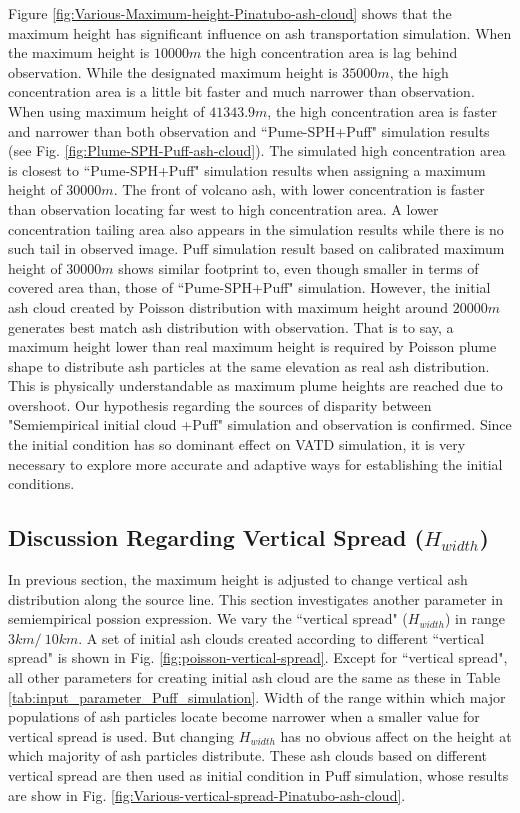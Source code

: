 \documentclass[draft,linenumbers]{agujournal2019}
\begin{document}
Figure \ref{fig:Various-Maximum-height-Pinatubo-ash-cloud} shows that the maximum height has significant influence on ash transportation simulation. When the maximum height is $10000 m$ the high concentration area is lag behind observation. While the designated maximum height is $35000 m$, the high concentration area is a little bit faster and much narrower than observation. When using maximum height of $41343.9 m$, the high concentration area is faster and narrower than both observation and ``Pume-SPH+Puff" simulation results (see Fig. \ref{fig:Plume-SPH-Puff-ash-cloud}). The simulated high concentration area is closest to ``Pume-SPH+Puff" simulation results when assigning a maximum height of $30000 m$. The front of volcano ash, with lower concentration is faster than observation locating far west to high concentration area. A lower concentration tailing area also appears in the simulation results while there is no such tail in observed image. Puff simulation result based on calibrated maximum height of $30000 m$ shows similar footprint to, even though smaller in terms of covered area than, those of ``Pume-SPH+Puff" simulation. However, the initial ash cloud created by Poisson distribution with maximum height around  $20000 m$ generates best match ash distribution with observation. That is to say, a maximum height lower than real maximum height is required by Poisson plume shape to distribute ash particles at the same elevation as real ash distribution. This is physically understandable as maximum plume heights are reached due to overshoot. 
Our hypothesis regarding the sources of disparity between "Semiempirical initial cloud +Puff" simulation and observation is confirmed. Since the initial condition has so dominant effect on VATD simulation, it is very necessary to explore more accurate and adaptive ways for establishing the initial conditions.

\subsection{Discussion Regarding Vertical Spread ($H_{width}$)}
In previous section, the maximum height is adjusted to change vertical ash distribution along the source line. This section investigates another parameter in semiempirical possion expression. We vary the ``vertical spread" ($H_{width}$) in range $3 km /~ 10 km$. A set of initial ash clouds created according to different ``vertical spread" is shown in Fig. \ref{fig:poisson-vertical-spread}. Except for ``vertical spread", all other parameters for creating initial ash cloud are the same as these in Table \ref{tab:input_parameter_Puff_simulation}. Width of the range within which major populations of ash particles locate become narrower when a smaller value for vertical spread is used. But changing $H_{width}$ has no obvious affect on the height at which majority of ash particles distribute. These ash clouds based on different vertical spread are then used as initial condition in Puff simulation, whose results are show in Fig. \ref{fig:Various-vertical-spread-Pinatubo-ash-cloud}.
\end{document}
